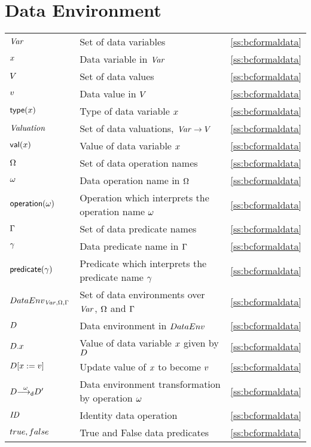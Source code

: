 {\section*{Data Environment}
\begin{tabular}{l>{\raggedright}p{.4\linewidth}<{}l}
${\text{\it Var\/}}$ & Set of data variables & \ref{ss:bcformaldata} \\
$x$ & Data variable in ${\text{\it Var\/}}$ & \ref{ss:bcformaldata} \\
$V$ & Set of data values & \ref{ss:bcformaldata} \\
${v}$ & Data value in $V$ & \ref{ss:bcformaldata} \\
$\mathop{\sf type}(x)$ & Type of data variable $x$ & \ref{ss:bcformaldata} \\
${\text{\it Valuation\/}}$ & Set of data valuations, ${\text{\it Var\/}} \rightarrow V$ & \ref{ss:bcformaldata} \\
${\mathop{\sf val}}(x)$ & Value of data variable $x$ & \ref{ss:bcformaldata} \\
$\Omega$ & Set of data operation names & \ref{ss:bcformaldata} \\
$\omega$ & Data operation name in $\Omega$ & \ref{ss:bcformaldata} \\
$\mathop{\sf operation}(\omega)$ & Operation which interprets the operation name $\omega$ & \ref{ss:bcformaldata} \\
$\Gamma$ & Set of data predicate names & \ref{ss:bcformaldata} \\
$\gamma$ & Data predicate name in $\Gamma$ & \ref{ss:bcformaldata} \\
$\mathop{\sf predicate}(\gamma)$ & Predicate which interprets the predicate name $\gamma$ & \ref{ss:bcformaldata} \\
${DataEnv_{{\text{\it Var\/}},\Omega,\Gamma}}$ & Set of data environments over ${\text{\it Var\/}}$, $\Omega$ and $\Gamma$ & \ref{ss:bcformaldata} \\
${D}$ & Data environment in ${DataEnv_{}}$ & \ref{ss:bcformaldata} \\
${D}.x$ & Value of data variable $x$ given by ${D}$ & \ref{ss:bcformaldata} \\
${D}[x\mathrel{:=}{v}]$ & Update value of $x$ to become ${v}$ & \ref{ss:bcformaldata} \\
${D} {\mathrel{{\stackrel{\omega}{\longrightarrow_{\mathrm{{\sf d}}}}}}} {D}'$ & Data environment transformation by operation $\omega$ & \ref{ss:bcformaldata} \\
${\text{\it ID\/}}$ & Identity data operation & \ref{ss:bcformaldata} \\
${true},{false}$ & True and False data predicates & \ref{ss:bcformaldata} \\
\end{tabular}
\vfil


}
